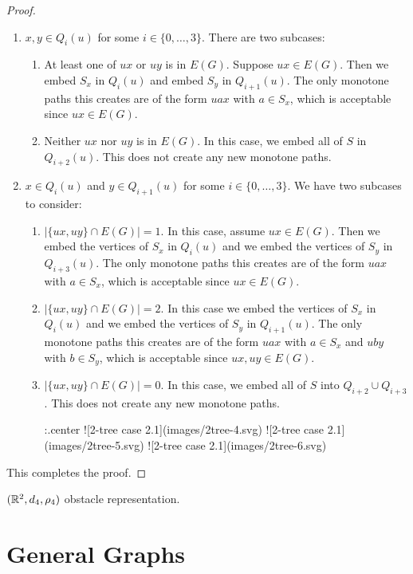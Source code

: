 \documentclass{patmorin}
\begin{document}
\begin{proof}
\begin{enumerate}
  \item $x,y\in Q_i(u)$ for some $i\in\{0,\ldots,3\}$. There are two subcases:
    \begin{enumerate}
    \item At least one of $ux$ or $uy$ is in $E(G)$. Suppose $ux\in E(G)$.  Then we embed $S_x$ in $Q_i(u)$ and embed $S_y$ in $Q_{i+1}(u)$.  The only monotone paths this creates are of the form $uax$ with $a\in S_x$, which is acceptable since $ux\in E(G)$.
    \item Neither $ux$ nor $uy$ is in $E(G)$. In this case, we embed all of $S$ in $Q_{i+2}(u)$.  This does not create any new monotone paths.
  \end{enumerate}

  \item $x\in Q_i(u)$ and $y\in Q_{i+1}(u)$ for some $i\in\{0,\ldots,3\}$.  We have two subcases to consider:
  \begin{enumerate}
    \item $|\{ux,uy\}\cap E(G)|=1$.  In this case, assume $ux\in E(G)$. Then we embed the vertices of $S_x$ in $Q_i(u)$ and we embed the vertices of $S_y$ in $Q_{i+3}(u)$.  The only monotone paths this creates are of the form $uax$ with $a\in S_x$, which is acceptable since $ux\in E(G)$.
    \item $|\{ux,uy\}\cap E(G)|=2$.  In this case we embed the vertices of $S_x$ in $Q_i(u)$ and we embed the vertices of $S_y$ in $Q_{i+1}(u)$.  The only monotone paths this creates are of the form $uax$ with $a\in S_x$ and $uby$ with $b\in S_y$, which is acceptable since $ux,uy\in E(G)$.
    \item $|\{ux,uy\}\cap E(G)|=0$.  In this case, we embed all of $S$ into $Q_{i+2}\cup Q_{i+3}$.  This does not create any new monotone paths.

    {:.center}
    ![2-tree case 2.1](images/2tree-4.svg)
    ![2-tree case 2.1](images/2tree-5.svg)
    ![2-tree case 2.1](images/2tree-6.svg)
\end{enumerate}
\end{enumerate}
This completes the proof.
\end{proof}

$(\mathbb{R}^2,d_4,\rho_4)$ obstacle representation.







\section{General Graphs}









\end{document}
